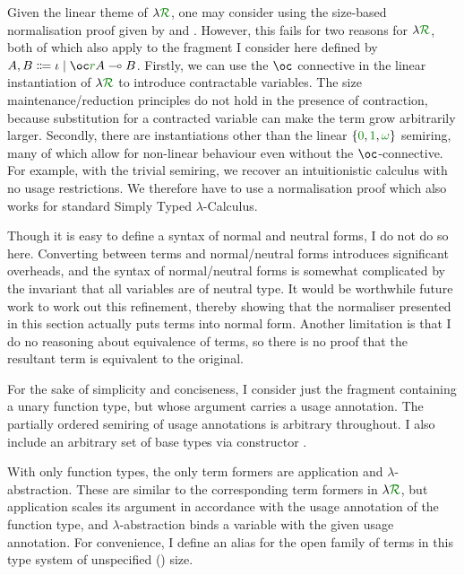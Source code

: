 Given the linear theme of $\name$, one may consider using the size-based
normalisation proof given by \citet[p.\ 71]{girard87linear} and
\citet{Krishnaswami13}.
However, this fails for two reasons for $\name$, both of which also apply to the
fragment I consider here defined by
$A, B \Coloneqq \iota \mid \oc\gr rA \multimap B$.
Firstly, we can use the $\oc$ connective in the linear instantiation of $\name$
to introduce contractable variables.
The size maintenance/reduction principles do not hold in the presence of
contraction, because substitution for a contracted variable can make the term
grow arbitrarily larger.
Secondly, there are instantiations other than the linear
$\{\gr0, \gr1, \gr\omega\}$ semiring, many of which allow for non-linear
behaviour even without the $\oc$-connective.
For example, with the trivial semiring, we recover an intuitionistic calculus
with no usage restrictions.
We therefore have to use a normalisation proof which also works for standard
Simply Typed $\lambda$-Calculus.

Though it is easy to define a syntax of normal and neutral forms, I do not do so
here.
Converting between terms and normal/neutral forms introduces significant
overheads, and the syntax of normal/neutral forms is somewhat complicated by the
invariant that all variables are of neutral type.
It would be worthwhile future work to work out this refinement, thereby showing
that the normaliser presented in this section actually puts terms into normal
form.
Another limitation is that I do no reasoning about equivalence of terms, so
there is no proof that the resultant term is equivalent to the original.

For the sake of simplicity and conciseness, I consider just the fragment
containing a unary function type, but whose argument carries a usage annotation.
The partially ordered semiring of usage annotations is arbitrary throughout.
I also include an arbitrary set of base types  via constructor
\AgdaInductiveConstructor{$\iota$}.


With only function types, the only term formers are application and
$\lambda$-abstraction.
These are similar to the corresponding term formers in $\name$, but application
scales its argument in accordance with the usage annotation of the function
type, and $\lambda$-abstraction binds a variable with the given usage
annotation.
For convenience, I define an alias  for the open family of
terms in this type system of unspecified (\AgdaPostulate{$\infty$}) size.


